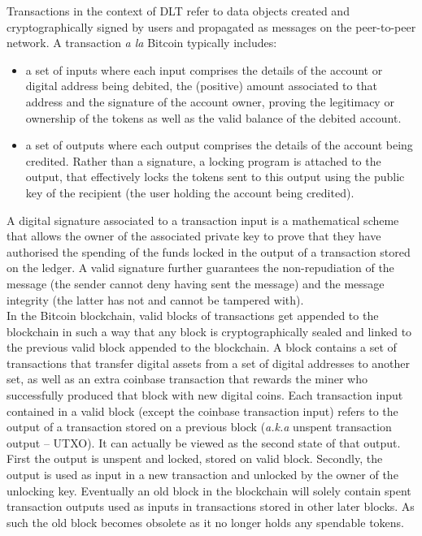 Transactions in the context of DLT refer to data objects created and cryptographically signed by users and propagated as messages on the peer-to-peer network. A transaction \textit{a la} Bitcoin typically includes:

\begin{itemize}
\item a set of inputs where each input comprises the details of the account or digital address being debited, the (positive) amount associated to that address and the signature of the account owner, proving the legitimacy or ownership of the tokens as well as the valid balance of the debited account. 
\item a set of outputs where each output comprises the details of the account being credited. Rather than a signature, a locking program is attached to the output, that effectively locks the tokens sent to this output using the public key of the recipient (the user holding the account being credited).
\end{itemize}

A digital signature associated to a transaction input is a mathematical scheme that allows the owner of the associated private key to prove that they have authorised the spending of the funds locked in the output of a transaction stored on the ledger. A valid signature further guarantees the non-repudiation of the message (the sender cannot deny having sent the message) and the message integrity (the latter has not and cannot be tampered with). \\

In the Bitcoin blockchain, valid blocks of transactions get appended to the blockchain in such a way that any block is cryptographically sealed and linked to the previous valid block appended to the blockchain. A block contains a set of transactions that transfer digital assets from a set of digital addresses to another set, as well as an extra coinbase transaction that rewards the miner who successfully produced that block with new digital coins. Each transaction input contained in a valid block (except the coinbase transaction input) refers to the output of a transaction stored on a previous block (\textit{a.k.a} unspent transaction output – UTXO).  It can actually be viewed as the second state of that output. First the output is unspent and locked, stored on valid block. Secondly, the output is used as input in a new transaction and unlocked by the owner of the unlocking key. Eventually an old block in the blockchain will solely contain spent transaction outputs used as inputs in transactions stored in other later blocks. As such the old block becomes obsolete as it no longer holds any spendable tokens. \\

